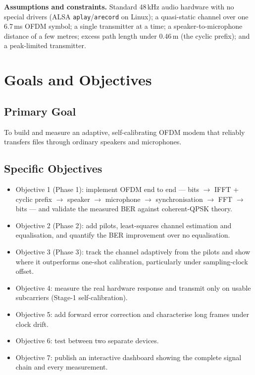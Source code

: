 \documentclass[11pt,a4paper]{report}
\begin{document}
\textbf{Assumptions and constraints.} Standard 48\,kHz audio hardware with no
special drivers (ALSA \texttt{aplay}/\texttt{arecord} on Linux); a quasi-static
channel over one 6.7\,ms OFDM symbol; a single transmitter at a time; a
speaker-to-microphone distance of a few metres; excess path length under
0.46\,m (the cyclic prefix); and a peak-limited transmitter.

\chapter{Goals and Objectives}

\section{Primary Goal}
To build and measure an adaptive, self-calibrating OFDM modem that reliably transfers
files through ordinary speakers and microphones.

\section{Specific Objectives}
\begin{itemize}
    \item Objective 1 (Phase 1): implement OFDM end to end --- bits $\rightarrow$
    IFFT + cyclic prefix $\rightarrow$ speaker $\rightarrow$ microphone $\rightarrow$
    synchronisation $\rightarrow$ FFT $\rightarrow$ bits --- and validate the measured
    BER against coherent-QPSK theory.
    \item Objective 2 (Phase 2): add pilots, least-squares channel estimation and
    equalisation, and quantify the BER improvement over no equalisation.
    \item Objective 3 (Phase 3): track the channel adaptively from the pilots and show
    where it outperforms one-shot calibration, particularly under sampling-clock offset.
    \item Objective 4: measure the real hardware response and transmit only on usable
    subcarriers (Stage-1 self-calibration).
    \item Objective 5: add forward error correction and characterise long frames under
    clock drift.
    \item Objective 6: test between two separate devices.
    \item Objective 7: publish an interactive dashboard showing the complete signal chain
    and every measurement.
\end{itemize}
\end{document}
